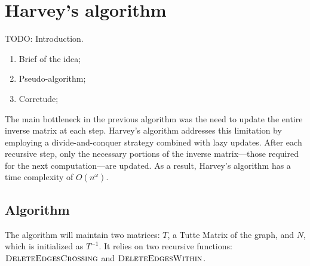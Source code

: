 \chapter{Harvey's algorithm}

TODO: Introduction.

\begin{enumerate}
    \item Brief of the idea;
    \item Pseudo-algorithm;
    \item Corretude;
\end{enumerate}

The main bottleneck in the previous algorithm was the need to update the entire inverse matrix at each step. 
Harvey's algorithm addresses this limitation by employing a divide-and-conquer strategy combined with lazy updates. 
After each recursive step, only the necessary portions of the inverse matrix—those required for the next computation—are updated.
As a result, Harvey's algorithm has a time complexity of \(O(n^\omega)\).

\section{Algorithm}

The algorithm will maintain two matrices: \(T\), a Tutte Matrix of the graph, and \(N\), which is initialized as \(T^{-1}\).
It relies on two recursive functions: \(\textsc{DeleteEdgesCrossing}\) and \(\textsc{DeleteEdgesWithin}\). 

